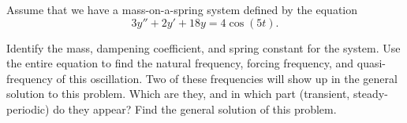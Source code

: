 \documentclass{ximera}
\begin{document}
\begin{exercise}
    Assume that we have a mass-on-a-spring system defined by the equation
    \begin{equation*}
        3y'' + 2y' + 18y = 4\cos(5t).
    \end{equation*}
    \begin{tasks}
        \task Identify the mass, dampening coefficient, and spring constant for the system.
        \task Use the entire equation to find the natural frequency, forcing frequency, and quasi-frequency of this oscillation.
        \task Two of these frequencies will show up in the general solution to this problem. Which are they, and in which part (transient, steady-periodic) do they appear?
        \task Find the general solution of this problem.
    \end{tasks}
\end{exercise}
\end{document}
